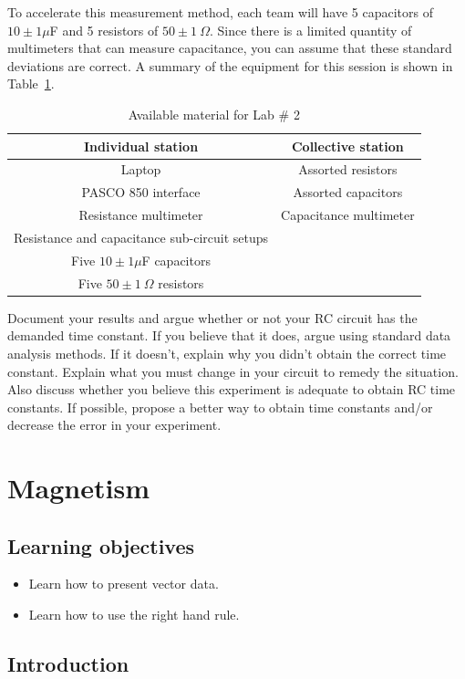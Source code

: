 \documentclass[12pt]{report}
\begin{document}
To accelerate this measurement method, each team will have 5 capacitors of $10\pm 1\mu$F and 5 resistors of $50\pm 1 \ \Omega$. Since there is a limited quantity of multimeters that can measure capacitance, you can assume that these standard deviations are correct. A summary of the equipment for this session is shown in Table~\ref{Tab:Lab2-material}.
\begin{table}[h]
\centering
\begin{tabular}{||c | c ||}
\hline
Individual station & Collective station\\ \hline
Laptop & Assorted resistors \\
PASCO 850 interface & Assorted capacitors \\
Resistance multimeter & Capacitance multimeter \\
Resistance and capacitance sub-circuit setups & \\
Five $10\pm 1 \mu$F capacitors & \\
Five $50 \pm 1 \ \Omega$ resistors &  \\
\hline
\end{tabular}
\caption{Available material for Lab \# 2}
\label{Tab:Lab2-material}
\end{table}

Document your results and argue whether or not your RC circuit has the demanded time constant. If you believe that it does, argue using standard data analysis methods. If it doesn't, explain why you didn't obtain the correct time constant. Explain what you must change in your circuit to remedy the situation. Also discuss whether you believe this experiment is adequate to obtain RC time constants. If possible, propose a better way to obtain time constants and/or decrease the error in your experiment.

\chapter{Magnetism}
\section{Learning objectives}
\begin{itemize}
\item Learn how to present vector data.
\item Learn how to use the right hand rule.
\end{itemize}
\section{Introduction}
\end{document}
